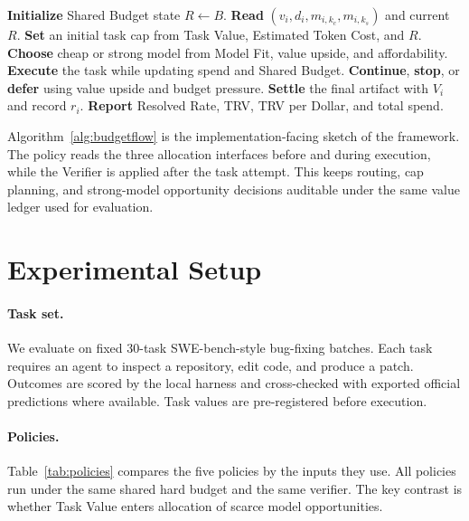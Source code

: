 \documentclass[sigconf,review,anonymous]{acmart}
\newcommand{\trv}{TRV\xspace}
\newcommand{\taskvalue}{Task Value\xspace}
\newcommand{\tokencost}{Estimated Token Cost\xspace}
\newcommand{\modelfit}{Model Fit\xspace}
\newcommand{\sharedbudget}{Shared Budget\xspace}
\newcommand{\verifier}{Verifier\xspace}
\begin{document}
\begin{algorithm}[t]
\caption{BudgetFlow batch policy sketch}
\label{alg:budgetflow}
\begin{algorithmic}[1]
\STATE \textbf{Initialize} \sharedbudget state $R \leftarrow B$.
    \STATE \textbf{Read} $(v_i,d_i,m_{i,k_c},m_{i,k_s})$ and current $R$.
    \STATE \textbf{Set} an initial task cap from \taskvalue, \tokencost, and $R$.
    \STATE \textbf{Choose} cheap or strong model from \modelfit, value upside, and affordability.
    \STATE \textbf{Execute} the task while updating spend and \sharedbudget.
    \STATE \textbf{Continue}, \textbf{stop}, or \textbf{defer} using value upside and budget pressure.
    \STATE \textbf{Settle} the final artifact with $V_i$ and record $r_i$.
\ENDFOR
\STATE \textbf{Report} Resolved Rate, \trv, \trv per Dollar, and total spend.
\end{algorithmic}
\end{algorithm}

Algorithm~\ref{alg:budgetflow} is the implementation-facing sketch of the framework. The policy reads the three allocation interfaces before and during execution, while the \verifier is applied after the task attempt. This keeps routing, cap planning, and strong-model opportunity decisions auditable under the same value ledger used for evaluation.

\section{Experimental Setup}
\label{sec:setup}
\paragraph{Task set.}
We evaluate on fixed 30-task SWE-bench-style bug-fixing batches. Each task requires an agent to inspect a repository, edit code, and produce a patch. Outcomes are scored by the local harness and cross-checked with exported official predictions where available. Task values are pre-registered before execution.

\paragraph{Policies.}
Table~\ref{tab:policies} compares the five policies by the inputs they use. All policies run under the same shared hard budget and the same verifier. The key contrast is whether \taskvalue enters allocation of scarce model opportunities.
\end{document}
